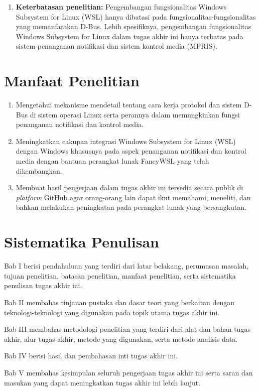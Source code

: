 \begin{enumerate}
    \item \textbf{Keterbatasan penelitian:} Pengembangan fungsionalitas Windows Subsystem for Linux (WSL) hanya dibatasi pada fungsionalitas-fungsionalitas yang memanfaatkan D-Bus. Lebih spesifiknya, pengembangan fungsionalitas Windows Subsystem for Linux dalam tugas akhir ini hanya terbatas pada sistem penanganan notifikasi dan sistem kontrol media (MPRIS).
\end{enumerate}

\section{Manfaat Penelitian}

\begin{enumerate}
    \item Mengetahui mekanisme mendetail tentang cara kerja protokol dan sistem D-Bus di sistem operasi Linux serta perannya dalam memungkinkan fungsi penanganan notifikasi dan kontrol media.

    \item Meningkatkan cakupan integrasi Windows Subsystem for Linux (WSL) dengan Windows khususnya pada aspek penanganan notifikasi dan kontrol media dengan bantuan perangkat lunak FancyWSL yang telah dikembangkan.

    \item Membuat hasil pengerjaan dalam tugas akhir ini tersedia secara publik di \textit{platform} GitHub agar orang-orang lain dapat ikut memahami, meneliti, dan bahkan melakukan peningkatan pada perangkat lunak yang bersangkutan.
\end{enumerate}

\section{Sistematika Penulisan}

\noindent Bab I berisi pendahuluan yang terdiri dari latar belakang, perumusan masalah, tujuan penelitian, batasan penelitian, manfaat penelitian, serta sistematika penulisan tugas akhir ini.

\noindent Bab II membahas tinjauan pustaka dan dasar teori yang berkaitan dengan teknologi-teknologi yang digunakan pada topik utama tugas akhir ini.

\noindent Bab III membahas metodologi penelitian yang terdiri dari alat dan bahan tugas akhir, alur tugas akhir, metode yang digunakan, serta metode analisis data.

\noindent Bab IV berisi hasil dan pembahasan inti tugas akhir ini.

\noindent Bab V membahas kesimpulan seluruh pengerjaan tugas akhir ini serta saran dan masukan yang dapat meningkatkan tugas akhir ini lebih lanjut.
